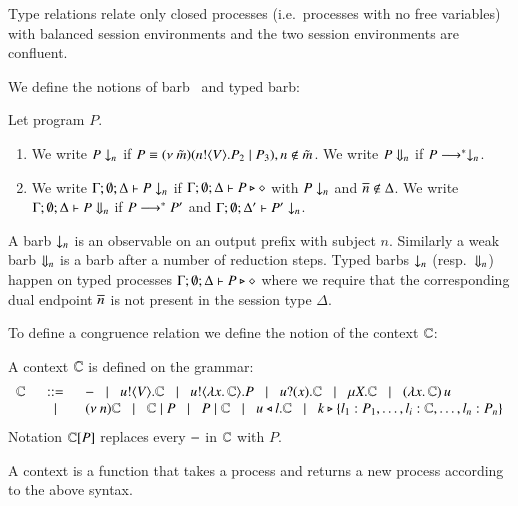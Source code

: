 Type relations relate only closed processes
(i.e.\ processes with no free variables)
with balanced session environments and the two session
environments are confluent.

We define the notions of barb~\cite{MiSa92} and typed barb:
%
\begin{definition}[Barbs]\rm
	Let program $P$.
	\begin{enumerate}
		\item	We write $P \downarrow_{n}$ if $P \equiv (\nu\ \tilde{m})(n ! \langle V \rangle . P_2 \;|\; P_3), n \notin \tilde{m}$.
			We write $P \Downarrow_{n}$ if $P \longrightarrow^* \downarrow_{n}$.

		\item	We write $\Gamma; \emptyset; \Delta \vdash P \downarrow_{n}$ if
			$\Gamma; \emptyset; \Delta \vdash P \triangleright \diamond$ with $P \downarrow_{n}$ and $\overline{n} \notin \Delta$.
			We write $\Gamma; \emptyset; \Delta \vdash P \Downarrow_{n}$ if $P \longrightarrow^* P'$ and
			$\Gamma; \emptyset; \Delta' \vdash P' \downarrow_{n}$.			
	\end{enumerate}
\end{definition}
%
A barb $\downarrow_{n}$ is an observable on an output prefix with subject $n$.
Similarly a weak barb $\Downarrow_{n}$ is a barb after a number of reduction steps.
Typed barbs $\downarrow_{n}$ (resp.\ $\Downarrow_{n}$)
happen on typed processes $\Gamma; \emptyset; \Delta \vdash P \triangleright \diamond$
where we require that the corresponding dual endpoint $\overline{n}$ is not present
in the session type $\Delta$.

To define a congruence relation we define the notion of the context ${\Bbb C}$:
%
\begin{definition}[Context]\rm
	A context ${\Bbb C}$ is defined on the grammar:
%
\[
	\begin{array}{rcl}
		{\Bbb C} &\;\;::=\;\;& - \;\;\;|\;\;\; u ! \langle V \rangle . {\Bbb C} \;\;\;|\;\;\; u ! \langle \lambda x.\,{\Bbb C} \rangle . P \;\;\;|\;\;\; u ? (x) . {\Bbb C} \;\;\;|\;\;\; \mu X. {\Bbb C} \;\;\;|\;\;\; (\lambda x.\,{\Bbb C})\,u\\
		& \;\;\;|\;\;\; & (\nu\ n) {\Bbb C} \;\;\;|\;\;\; {\Bbb C} \;|\; P \;\;\;|\;\;\; P \;|\; {\Bbb C} \;\;\;|\;\;\; u \triangleleft l . {\Bbb C} \;\;\;|\;\;\; k \triangleright \{l_1: P_1, \dots, l_i:{\Bbb C}, \dots, l_n: P_n\}
	\end{array}
\]
%
	Notation ${\Bbb C}[P]$ replaces every $-$ in ${\Bbb C}$ with $P$.
\end{definition}
%
\noi A context is a function that takes a process and returns a new process
according to the above syntax.

